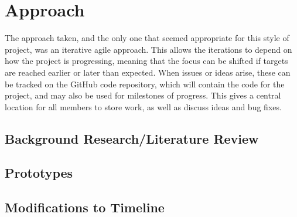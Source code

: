 \section{Approach}

The approach taken, and the only one that seemed appropriate for this style of
project, was an iterative agile approach. This allows the iterations to depend
on how the project is progressing, meaning that the focus can be shifted if targets
are reached earlier or later than expected.
When issues or ideas arise, these can be tracked on the GitHub code repository,
which will contain the code for the project, and may also be used for milestones
of progress. This gives a central location for all members to store work, as well
as discuss ideas and bug fixes.

\subsection{Background Research/Literature Review}

\subsection{Prototypes}

\subsection{Modifications to Timeline}
